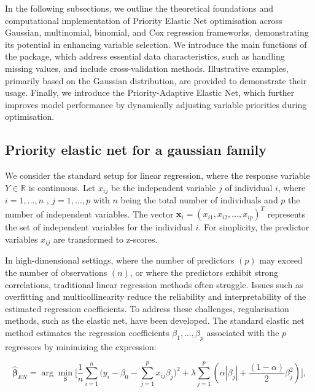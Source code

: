 In the following subsections, we outline the theoretical foundations and computational implementation of Priority Elastic Net optimisation across Gaussian, multinomial, binomial, and Cox regression frameworks, demonstrating its potential in enhancing variable selection. We introduce the main functions of the  package, which address essential data characteristics, such as handling missing values, and include cross-validation methods. Illustrative examples, primarily based on the Gaussian distribution, are provided to demonstrate their usage. Finally, we introduce the Priority-Adaptive Elastic Net, which further improves model performance by dynamically adjusting variable priorities during optimisation.

\subsection{Priority elastic net for a gaussian family}\label{sub:Gaussian}

We consider the standard setup for linear regression, where the response variable \( Y \in \mathbb{R} \) is continuous. Let \(x_{ij}\) be the independent variable \(j\) of individual \(i\), where \(i = 1, \ldots, n\) , \(j = 1, \ldots, p\)  with \(n\) being the total number of individuals and \(p\) the number of independent variables.  The vector \(\bm{x}_i = (x_{i1}, x_{i2}, \ldots, x_{ip})^T\) represents the set of independent variables for the individual \(i\).
For simplicity, the predictor variables \( x_{ij} \) are transformed to z-scores.

In high-dimensional settings, where the number of predictors $(p)$ may exceed the number of observations $(n)$, or where the predictors exhibit strong correlations, traditional linear regression methods often struggle. Issues such as overfitting and multicollinearity reduce the reliability and interpretability of the estimated regression coefficients. To address these challenges, regularisation methods, such as the elastic net, have been developed. The standard elastic net method \citep{Zou2005elasticnet} estimates the regression coefficients $\beta_{1}, \ldots ,\beta_{p} $ associated with the $p$ regressors by minimizing the expression:

 \begin{equation}
 \label{eq: elastic net}
\hat{\bm{\beta}}_{EN}=\arg \min_{\bm{\beta}} \Bigg[ \frac{1}{n}\sum\limits_{i=1}^{n}\bigg(y_i- \beta_{0}- \sum\limits_{j=1}^{p}x_{ij}\beta_j\bigg)^2 +\lambda\sum_{j=1}^p \left(\alpha |\beta_j| + \frac{(1 - \alpha)}{2}  \beta_j^2\right)\Bigg], 
 \end{equation}

